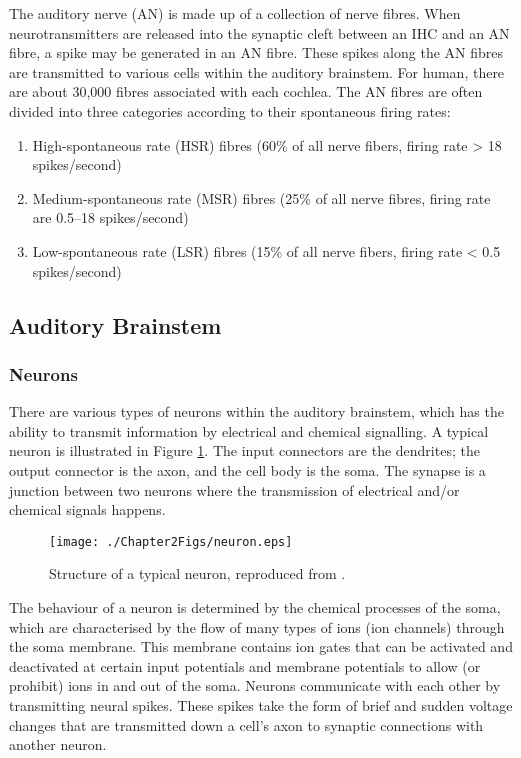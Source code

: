 \documentclass[11pt]{article}
\begin{document}
The auditory nerve (AN) is made up of a collection of nerve fibres. When
neurotransmitters are released into the synaptic cleft between an IHC
and an AN fibre, a spike may be generated in an AN fibre. These
spikes along the AN fibres are transmitted to various cells within the
auditory brainstem. For human, there are about 30,000 fibres
associated with each cochlea. The AN fibres are often divided into
three categories according to their spontaneous firing rates:

\begin{enumerate}
\item High-spontaneous rate (HSR) fibres (60\% of all nerve fibers,
   firing rate > 18 spikes/second)
\item Medium-spontaneous rate (MSR) fibres (25\% of all nerve
   fibres, firing rate are 0.5--18 spikes/second)
\item Low-spontaneous rate (LSR) fibres (15\% of all nerve fibers,
   firing rate < 0.5 spikes/second)
\end{enumerate}

\subsection{Auditory Brainstem}
\label{sec-2-4}
\label{sec:ch2-auditory-brainstem}
\subsubsection{Neurons}
\label{sec-2-4-1}
\label{sec:ch2-neurons}

There are various types of neurons within the auditory brainstem,
which has the ability to transmit information by electrical and
chemical signalling. A typical neuron is illustrated in
Figure \ref{fig:neuron}. The input connectors are the dendrites; the
output connector is the axon, and the cell body is the soma. The
synapse is a junction between two neurons where the transmission of
electrical and/or chemical signals happens.

\begin{figure}[htb]
\centering
\texttt{[image: ./Chapter2Figs/neuron.eps]}
\caption{\label{fig:neuron}Structure of a typical neuron, reproduced from \cite{WikiNeuron}.}
\end{figure}

The behaviour of a neuron is determined by the chemical
processes of the soma, which are characterised by the flow of many
types of ions (ion channels) through the soma membrane. This membrane
contains ion gates that can be activated and deactivated at certain
input potentials and membrane potentials to allow (or prohibit) ions
in and out of the soma. Neurons communicate with each other by
transmitting neural spikes. These spikes take the form of brief and
sudden voltage changes that are transmitted down a cell's axon to
synaptic connections with another neuron.
\end{document}

